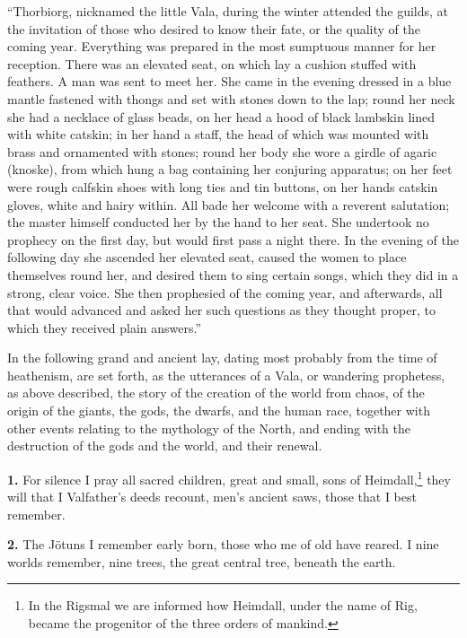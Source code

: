 ``Thorbiorg, nicknamed the little Vala, during the winter attended the
guilds, at the invitation of those who desired to know their fate, or
the quality of the coming year. Everything was prepared in the most
sumptuous manner for her reception. There was an elevated seat, on
which lay a cushion stuffed with feathers. A man was sent to meet her.
She came in the evening dressed in a blue mantle fastened with thongs
and set with stones down to the lap; round her neck she had a
necklace of glass beads, on her head a hood of black lambskin lined
with white catskin; in her hand a staff, the head of which was mounted
with brass and ornamented with stones; round her body she wore a
girdle of agaric (knoske), from which hung a bag containing her
conjuring apparatus; on her feet were rough calfskin shoes with long
ties and tin buttons, on her hands catskin gloves, white and hairy
within. All bade her welcome with a reverent salutation; the master
himself conducted her by the hand to her seat. She undertook no
prophecy on the first day, but would first pass a night there. In the
evening of the following day she ascended her elevated seat, caused
the women to place themselves round her, and desired them to sing
certain songs, which they did in a strong, clear voice. She then
prophesied of the coming year, and afterwards, all that would advanced
and asked her such questions as they thought proper, to which they
received plain answers.''

In the following grand and ancient lay, dating most probably from the
time of heathenism, are set forth, as the utterances of a Vala, or
wandering prophetess, as above described, the story of the creation of
the world from chaos, of the origin of the giants, the gods, the
dwarfs, and the human race, together with other events relating to the
mythology of the North, and ending with the destruction of the gods
and the world, and their renewal.


\textbf{1.} For silence I pray all sacred children, great and small, sons of
Heimdall,\footnote{In the Rigsmal we are informed how Heimdall, under the
name of Rig, became the progenitor of the three orders of mankind.} they will that I Valfather's deeds recount, men's ancient
saws, those that I best remember.

\textbf{2.} The Jötuns I remember early born, those who me of old have
reared. I nine worlds remember, nine trees, the great central tree,
beneath the earth.

